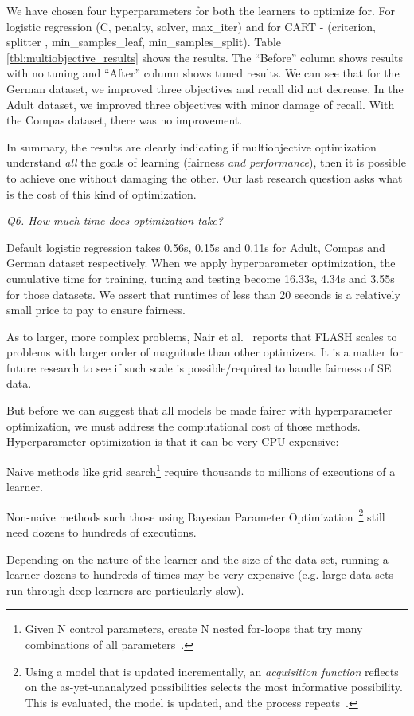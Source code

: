  We have chosen four hyperparameters for both the learners to optimize for. For logistic regression (C, penalty, solver, max\_iter) and for CART - (criterion, splitter , min\_samples\_leaf, min\_samples\_split). Table \ref{tbl:multiobjective_results} shows the results. The ``Before'' column shows results with no tuning and ``After'' column shows tuned results. We can see that for
 the German dataset, we improved three objectives and recall did not decrease. In the Adult dataset, we improved three objectives with minor damage of recall. 
 With the
 Compas dataset, there was no improvement. 
 
 In summary, the results are clearly indicating if  multiobjective  optimization understand {\em all} the goals of learning
 (fairness {\em and performance}), then it is possible to achieve one without
 damaging the other. Our last research question asks  what is the cost of this kind of optimization.

{\em Q6. How much time does optimization take?}

Default logistic regression takes 0.56s, 0.15s and 0.11s for Adult, Compas and German dataset respectively. When we apply hyperparameter optimization, the cumulative time for training, tuning and testing become 16.33s, 4.34s and 3.55s for those datasets. 
We assert that  runtimes of less than 20 seconds is a relatively small price to pay to ensure fairness. 

As to larger, more complex problems, Nair et al.~\cite{8469102} reports
that FLASH scales to problems with larger order of magnitude than other optimizers. It is a matter for future research to see if such scale is possible/required to handle fairness of SE data. 



But before we can suggest that all models be made fairer with hyperparameter optimization, we must address the computational cost of those methods.
Hyperparameter optimization is that it can  be very CPU expensive:
\bi
\item
Naive methods like grid search\footnote{Given N control parameters, create N nested for-loops that try many combinations of all parameters~\cite{Bergstra:2012}.} require thousands to millions of executions of a learner. 
\item
Non-naive  methods such those using Bayesian Parameter Optimization~\footnote{Using a model that is updated incrementally, an {\em acquisition function}  reflects on the as-yet-unanalyzed possibilities selects the most informative possibility.
This is evaluated, the model is updated, and the process repeats~\cite{nair2017flash,zuluaga2016varepsilon,Golovin:2017}.}
still need dozens to hundreds of executions. 
\item
Depending  on the nature of the learner and the size of the data set,
running a learner  
dozens to hundreds of times may be very   expensive (e.g. large data sets run through deep learners are particularly slow). 
\ei

